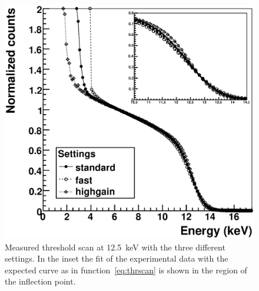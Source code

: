 \begin{figure}
\caption{Measured threshold scan at 12.5~keV with the three different settings. In the inset the fit of the experimental data with the expected curve as in function~\ref{eq:thrscan} is shown in the region of the inflection point.} \label{fig:expthrscan}
\includegraphics[width=\textwidth]{fig5.eps}
\end{figure} 

